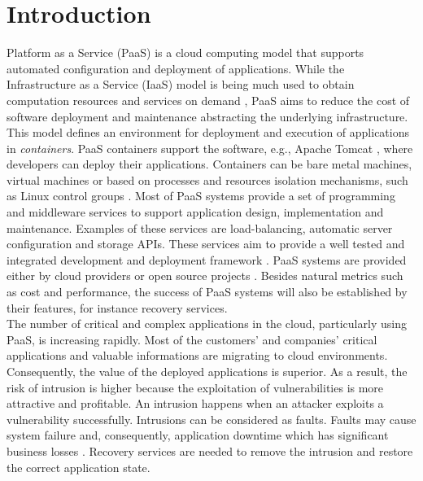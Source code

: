 \section{Introduction}\label{sec:Introduction}

Platform as a Service (PaaS) is a cloud computing model that supports automated configuration and deployment of applications. While the Infrastructure as a Service (IaaS) model is being much used to obtain computation resources and services on demand \cite{Lenk2009,Armbrust2009}, PaaS aims to reduce the cost of software deployment and maintenance abstracting the underlying infrastructure. This model defines an environment for deployment and execution of applications in \textit{containers}. PaaS containers support the software, e.g., Apache Tomcat \cite{tomcat}, where developers can deploy their applications. Containers can be bare metal machines, virtual machines or based on processes and resources isolation mechanisms, such as Linux control groups \cite{Menage2007}. Most of PaaS systems provide a set of programming and middleware services to support application design, implementation and maintenance. Examples of these services are load-balancing, automatic server configuration and storage APIs. These services aim to provide a well tested and integrated development and deployment framework \cite{Vaquero2011}. PaaS systems are provided either by cloud providers \cite{AmazonElasticBeanstalk,GoogleAppEngine,Heroku,OpenShift} or open source projects \cite{Appscale,Cloudfoundry,ApacheStratos}. Besides natural metrics such as cost and performance, the success of PaaS systems will also be established by their features, for instance recovery services.\\


The number of critical and complex applications in the cloud, particularly using PaaS, is increasing rapidly. Most of the customers' and companies' critical applications and valuable informations are migrating to cloud environments. Consequently, the value of the deployed applications is superior. As a result, the risk of intrusion is higher because the exploitation of vulnerabilities is more attractive and profitable. An intrusion happens when an attacker exploits a vulnerability successfully. Intrusions can be considered as faults. Faults may cause system failure and, consequently, application downtime which has significant business losses \cite{Patterson2002a}. Recovery services are needed to remove the intrusion and restore the correct application state.\\

